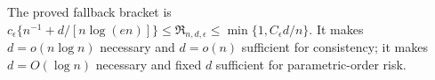 The proved fallback bracket is \(c_\epsilon\{n^{-1}+d/[n\log(en)]\}\leq\mathfrak R_{n,d,\epsilon}\leq\min\{1,C_\epsilon d/n\}\).  It makes \(d=o(n\log n)\) necessary and \(d=o(n)\) sufficient for consistency; it makes \(d=O(\log n)\) necessary and fixed \(d\) sufficient for parametric-order risk.